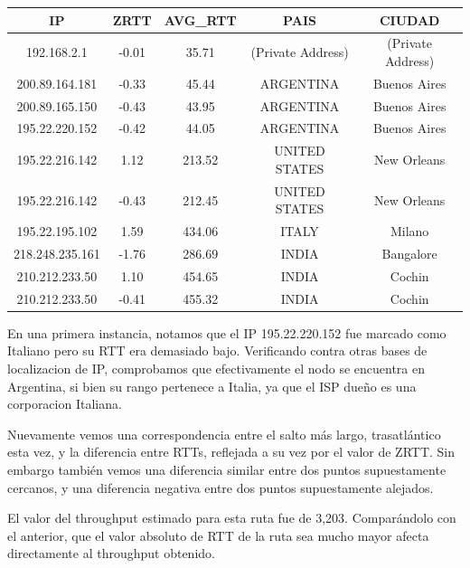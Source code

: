 \begin{tabular}{|c@{\hspace{5ex}}c@{\hspace{5ex}}c@{\hspace{5ex}}c@{\hspace{5ex}}c|}
 \hline
 \rule{0pt}{1.2em}IP & ZRTT & AVG\_RTT & PAIS & CIUDAD\\[0.2em]
 \hline

\rule{0pt}{1.2em} 192.168.2.1  &  -0.01 & 35.71 & (Private Address) & (Private Address) \\[0.2em]
\rule{0pt}{1.2em} 200.89.164.181  &  -0.33 & 45.44 & ARGENTINA & Buenos Aires \\[0.2em]
\rule{0pt}{1.2em} 200.89.165.150  &  -0.43 & 43.95 & ARGENTINA & Buenos Aires \\[0.2em]
\rule{0pt}{1.2em} 195.22.220.152  &  -0.42 & 44.05 & ARGENTINA & Buenos Aires \\[0.2em]
\rule{0pt}{1.2em} 195.22.216.142  &  1.12 & 213.52 & UNITED STATES & New Orleans \\[0.2em]
\rule{0pt}{1.2em} 195.22.216.142  &  -0.43 & 212.45 & UNITED STATES & New Orleans \\[0.2em]
\rule{0pt}{1.2em} 195.22.195.102  &  1.59 & 434.06 & ITALY & Milano \\[0.2em]
\rule{0pt}{1.2em} 218.248.235.161  &  -1.76 & 286.69 & INDIA & Bangalore \\[0.2em]
\rule{0pt}{1.2em} 210.212.233.50  &  1.10 & 454.65 & INDIA & Cochin \\[0.2em]
\rule{0pt}{1.2em} 210.212.233.50  &  -0.41 & 455.32 & INDIA & Cochin \\[0.2em]
\hline
 \end{tabular}

 En una primera instancia, notamos que el IP 195.22.220.152 fue marcado como Italiano pero su RTT era demasiado bajo. Verificando contra otras bases de localizacion de IP, comprobamos que efectivamente el nodo se encuentra en Argentina, si bien su rango pertenece a Italia, ya que el ISP dueño es una corporacion Italiana.

 Nuevamente vemos una correspondencia entre el salto más largo, trasatlántico esta vez, y la diferencia entre RTTs, reflejada a su vez por el valor de ZRTT. Sin embargo también vemos una diferencia similar entre dos puntos supuestamente cercanos, y una diferencia negativa entre dos puntos supuestamente alejados.

 El valor del throughput estimado para esta ruta fue de 3,203. Comparándolo con el anterior, que el valor absoluto de RTT de la ruta sea mucho mayor afecta directamente al throughput obtenido.

